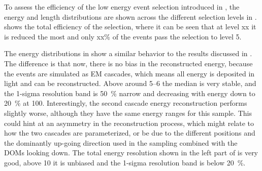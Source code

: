 To assess the efficiency of the low energy event selection introduced in , the energy and length distributions are shown across the different selection levels in .  shows the total efficiency of the selection, where it can be seen that at level xx it is reduced the most and only xx\% of the events pass the selection to level 5.


The energy distributions in  show a similar behavior to the results discussed in . The difference is that now, there is no bias in the reconstructed energy, because the events are simulated as EM cascades, which means all energy is deposited in light and can be reconstructed. Above around \SIrange{5}{6}{\gev} the median is very stable, and the 1-sigma resolution band is \SI{50}{\percent} narrow and decreasing with energy down to \SI{20}{\percent} at \SI{100}{\gev}. Interestingly, the second cascade energy reconstruction performs slightly worse, although they have the same energy ranges for this sample. This could hint at an asymmetry in the reconstruction process, which might relate to how the two cascades are parameterized, or be due to the different positions and the dominantly up-going direction used in the sampling combined with the DOMs looking down. The total energy resolution shown in the left part of  is very good, above \SI{10}{\gev} it is unbiased and the 1-sigma resolution band is below \SI{20}{\percent}.

